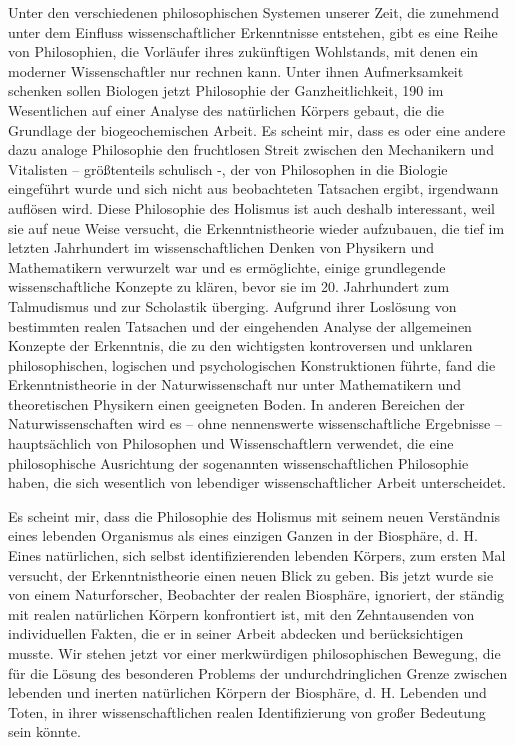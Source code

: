 \documentclass[11pt,a4paper]{book}
\begin{document}
Unter den verschiedenen philosophischen Systemen unserer Zeit, die zunehmend unter dem Einfluss wissenschaftlicher Erkenntnisse entstehen, gibt es eine Reihe von Philosophien, die Vorläufer ihres zukünftigen Wohlstands, mit denen ein moderner Wissenschaftler nur rechnen kann. Unter ihnen Aufmerksamkeit schenken sollen Biologen jetzt Philosophie der Ganzheitlichkeit, 190 im Wesentlichen auf einer Analyse des natürlichen Körpers gebaut, die die Grundlage der biogeochemischen Arbeit. Es scheint mir, dass es oder eine andere dazu analoge Philosophie den fruchtlosen Streit zwischen den Mechanikern und Vitalisten -- größtenteils schulisch -, der von Philosophen in die Biologie eingeführt wurde und sich nicht aus beobachteten Tatsachen ergibt, irgendwann auflösen wird. Diese Philosophie des Holismus ist auch deshalb interessant, weil sie auf neue Weise versucht, die Erkenntnistheorie wieder aufzubauen, die tief im letzten Jahrhundert im wissenschaftlichen Denken von Physikern und Mathematikern verwurzelt war und es ermöglichte, einige grundlegende wissenschaftliche Konzepte zu klären, bevor sie im 20. Jahrhundert zum Talmudismus und zur Scholastik überging. Aufgrund ihrer Loslösung von bestimmten realen Tatsachen und der eingehenden Analyse der allgemeinen Konzepte der Erkenntnis, die zu den wichtigsten kontroversen und unklaren philosophischen, logischen und psychologischen Konstruktionen führte, fand die Erkenntnistheorie in der Naturwissenschaft nur unter Mathematikern und theoretischen Physikern einen geeigneten Boden. In anderen Bereichen der Naturwissenschaften wird es -- ohne nennenswerte wissenschaftliche Ergebnisse -- hauptsächlich von Philosophen und Wissenschaftlern verwendet, die eine philosophische Ausrichtung der sogenannten wissenschaftlichen Philosophie haben, die sich wesentlich von lebendiger wissenschaftlicher Arbeit unterscheidet.



Es scheint mir, dass die Philosophie des Holismus mit seinem neuen Verständnis eines lebenden Organismus als eines einzigen Ganzen in der Biosphäre, d. H. Eines natürlichen, sich selbst identifizierenden lebenden Körpers, zum ersten Mal versucht, der Erkenntnistheorie einen neuen Blick zu geben. Bis jetzt wurde sie von einem Naturforscher, Beobachter der realen Biosphäre, ignoriert, der ständig mit realen natürlichen Körpern konfrontiert ist, mit den Zehntausenden von individuellen Fakten, die er in seiner Arbeit abdecken und berücksichtigen musste. Wir stehen jetzt vor einer merkwürdigen philosophischen Bewegung, die für die Lösung des besonderen Problems der undurchdringlichen Grenze zwischen lebenden und inerten natürlichen Körpern der Biosphäre, d. H. Lebenden und Toten, in ihrer wissenschaftlichen realen Identifizierung von großer Bedeutung sein könnte.
\end{document}

